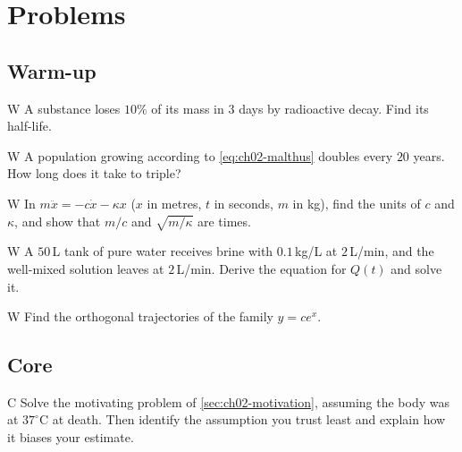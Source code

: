 \section{Problems}\label{sec:ch02-problems}

\subsection*{Warm-up}

\begin{problem}{W}\label{prob:ch02-w1}
A substance loses $10\%$ of its mass in $3$ days by radioactive decay. Find
its half-life.
\end{problem}

\begin{problem}{W}\label{prob:ch02-w2}
A population growing according to \eqref{eq:ch02-malthus} doubles every $20$
years. How long does it take to triple?
\end{problem}

\begin{problem}{W}\label{prob:ch02-w3}
In $m\ddot{x} = -c\dot{x} - \kappa x$ ($x$ in metres, $t$ in seconds, $m$ in
kg), find the units of $c$ and $\kappa$, and show that $m/c$ and
$\sqrt{m/\kappa}$ are times.
\end{problem}

\begin{problem}{W}\label{prob:ch02-w4}
A $50$\,L tank of pure water receives brine with $0.1$\,kg/L at $2$\,L/min,
and the well-mixed solution leaves at $2$\,L/min. Derive the equation for
$Q(t)$ and solve it.
\end{problem}

\begin{problem}{W}\label{prob:ch02-w5}
Find the orthogonal trajectories of the family $y = ce^x$.
\end{problem}

\subsection*{Core}

\begin{problem}{C}\label{prob:ch02-c1}
Solve the motivating problem of \cref{sec:ch02-motivation}, assuming the body
was at $37^\circ$C at death. Then identify the assumption you trust least and
explain how it biases your estimate.
\end{problem}

